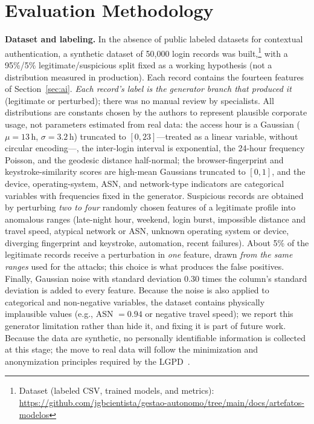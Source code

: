 \documentclass[conference]{IEEEtran}
\begin{document}
\section{Evaluation Methodology}
\label{sec:method}
\textbf{Dataset and labeling.} In the absence of public labeled
datasets for contextual authentication, a synthetic dataset of
50{,}000 login records was built,\footnote{Dataset (labeled CSV, trained models, and metrics): \url{https://github.com/jgbcientista/gestao-autonomo/tree/main/docs/artefatos-modelos}} with a 95\%/5\%
legitimate/suspicious split fixed as a working hypothesis (not a
distribution measured in production). Each record contains the fourteen
features of Section~\ref{sec:ai}. \emph{Each record's label is the
generator branch that produced it} (legitimate or perturbed); there was
no manual review by specialists. All distributions are constants chosen
by the authors to represent plausible corporate usage, not parameters
estimated from real data: the access hour is a Gaussian ($\mu=13$\,h,
$\sigma=3.2$\,h) truncated to $[0,23]$---treated as a linear variable,
without circular encoding---, the inter-login interval is exponential,
the 24-hour frequency Poisson, and the geodesic distance half-normal;
the browser-fingerprint and keystroke-similarity scores are high-mean
Gaussians truncated to $[0,1]$, and the device, operating-system, ASN,
and network-type indicators are categorical variables with frequencies
fixed in the generator. Suspicious records are obtained by perturbing
\emph{two to four} randomly chosen features of a legitimate profile into
anomalous ranges (late-night hour, weekend, login burst, impossible
distance and travel speed, atypical network or ASN, unknown operating
system or device, diverging fingerprint and keystroke, automation, recent
failures). About 5\% of the legitimate records receive a perturbation in
\emph{one} feature, drawn \emph{from the same ranges} used for the
attacks; this choice is what produces the false positives. Finally,
Gaussian noise with standard deviation $0.30$ times the column's
standard deviation is added to every feature. Because the noise is also
applied to categorical and non-negative variables, the dataset contains
physically implausible values (e.g., ASN $=0.94$ or negative travel
speed); we report this generator limitation rather than hide it, and
fixing it is part of future work. Because the data are synthetic, no
personally identifiable information is collected at this stage; the move
to real data will follow the minimization and anonymization principles
required by the LGPD~\cite{lgpd2018}.
\end{document}
